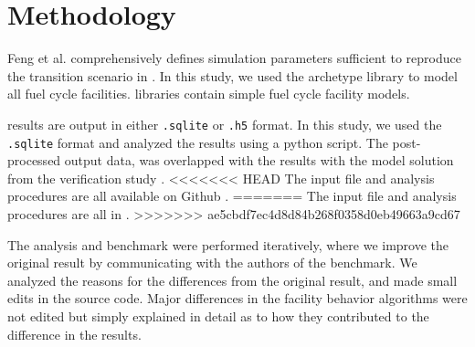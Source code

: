 \section{Methodology}

Feng et al. comprehensively defines simulation parameters
sufficient to reproduce the transition scenario in \Cyclus.
In this study, we used the \Cycamore \cite{huff_fundamental_2016}
 archetype library to model
all fuel cycle facilities. \Cycamore libraries contain
simple fuel cycle facility models. 

\Cyclus results are output in either \texttt{.sqlite} or
\texttt{.h5} format. In this study, we used the
\texttt{.sqlite} format and analyzed the results
using a python script. The post-processed
output data, was overlapped with the results with the
model solution from the verification study \cite{feng_standardized_2016}.
<<<<<<< HEAD
The input file and analysis procedures are all available on Github \cite{bae_arfc/transition-scenarios:_2018}.
=======
The input file and analysis procedures are all in 
\cite{bae_arfc/transition-scenarios:_2018}.
>>>>>>> ae5cbdf7ec4d8d84b268f0358d0eb49663a9cd67

The analysis and benchmark were performed iteratively,
where we improve the original result by communicating
with the authors of the benchmark. 
We analyzed the reasons for the differences from the original
result, and made small edits in the source code.
Major differences in the facility behavior algorithms were not edited but
simply explained in detail as to how they contributed
to the difference in the results.
